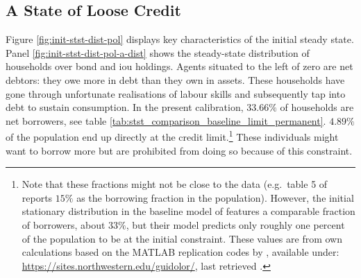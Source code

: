 \documentclass[a4paper,12pt]{article} %
\numberwithin{equation}{section} %
\numberwithin{figure}{section}
\numberwithin{table}{section}
\begin{document}
\subsection{A State of Loose Credit}
\label{sec:limit-stst-loose}

Figure \ref{fig:init-stst-dist-pol} displays key characteristics of the initial steady state. Panel \ref{fig:init-stst-dist-pol-a-dist} shows the steady-state distribution of households over bond and \Gls{iou} holdings. Agents situated to the left of zero are net debtors: they owe more in debt than they own in assets. These households have gone through unfortunate realisations of labour skills and subsequently tap into debt to sustain consumption. In the present calibration, $33.66\%$ of households are net borrowers, see table \ref{tab:stst_comparison_baseline_limit_permanent}. $4.89\%$ of the population end up directly at the credit limit.\footnote{Note that these fractions might not be close to the data (e.g.~table 5 of \cite[p.~722]{kaplan2018} reports $15\%$ as the borrowing fraction in the population). However, the initial stationary distribution in the baseline model of \textcite{gl2017} features a comparable fraction of borrowers, about $33\%$, but their model predicts only roughly one percent of the population to be at the initial constraint. These values are from own calculations based on the MATLAB replication codes by \textcite{gl2017}, available under: \url{https://sites.northwestern.edu/guidolor/}, last retrieved .} These individuals might want to borrow more but are prohibited from doing so because of this constraint.
\end{document}
